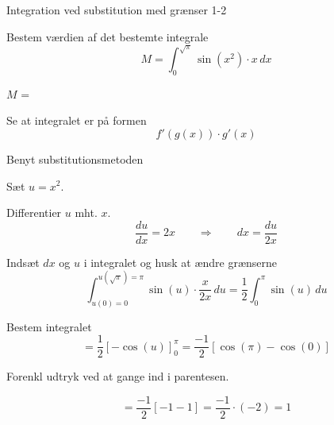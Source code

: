 \documentclass{article}
\begin{document}
\begin{exercise}{Integration ved substitution med grænser 1-2}


Bestem værdien af det bestemte integrale
\[
M =\int_{0}^{\sqrt{\pi}} \sin(x^2) \cdot x \, dx
\]

$M$ =



\hint

Se at integralet er på formen
\[
f'(g(x)) \cdot g'(x)
\]

\hint

Benyt substitutionsmetoden

\hint

Sæt $u=x^2$.


\hint

Differentier $u$ mht. $x$.
\[
\frac{du}{dx} = 2x \qquad\Rightarrow \qquad dx = \frac{du}{2x}
\]

\hint

Indsæt $dx$ og $u$ i integralet og husk at ændre grænserne
\[
\int_{u(0)=0}^{u(\sqrt{\pi})=\pi} \sin(u) \cdot \frac{x}{2x} \, du = \frac{1}{2} \int_0^\pi \sin(u) \, du
\]

\hint

Bestem integralet
\[
= \frac{1}{2} \left[ - \cos(u) \right]_0^\pi = \frac{-1}{2} \left[\cos(\pi) - \cos(0) \right]
\]

\hint
Forenkl udtryk ved at gange ind i parentesen.

\hint

\[
= \frac{-1}{2} \left[-1 - 1 \right] = \frac{-1}{2} \cdot (-2) = 1
\]


\end{exercise}

\newpage
\end{document}
